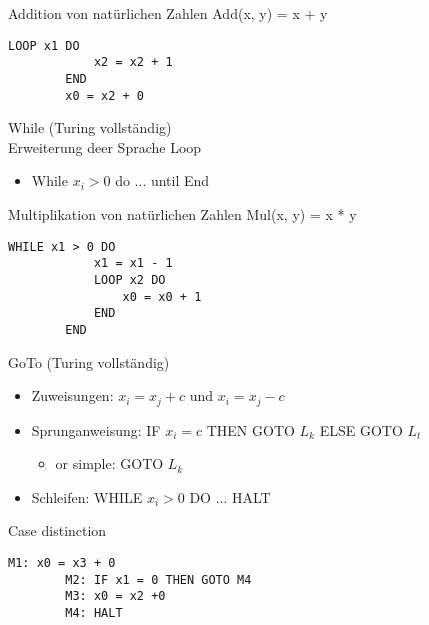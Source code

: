 \begin{example2}{Addition von natürlichen Zahlen}
    Add(x, y) = x + y
    \begin{lstlisting}[style=Pseudocode]
        LOOP x1 DO
            x2 = x2 + 1
        END
        x0 = x2 + 0
    \end{lstlisting}
\end{example2}

\begin{KR}{While (Turing vollständig)}\\
    Erweiterung deer Sprache Loop
    \begin{itemize}
        \item While $x_i > 0$ do ... until End
    \end{itemize}
\end{KR}

\begin{example2}{Multiplikation von natürlichen Zahlen}
    Mul(x, y) = x * y
    \begin{lstlisting}[style=Pseudocode]
        WHILE x1 > 0 DO
            x1 = x1 - 1
            LOOP x2 DO
                x0 = x0 + 1
            END
        END
    \end{lstlisting}
\end{example2}

\begin{KR}{GoTo (Turing vollständig)}
    \begin{itemize}
        \item Zuweisungen: $x_i = x_j + c$ und $x_i = x_j - c$
        \item Sprunganweisung: IF $x_i = c$ THEN GOTO $L_k$ ELSE GOTO $L_t$
        \begin{itemize}
            \item or simple: GOTO $L_k$
        \end{itemize}
        \item Schleifen: WHILE $x_i > 0$ DO ... HALT
    \end{itemize}
\end{KR}

\begin{example2}{Case distinction}
    \begin{lstlisting}[style=Pseudocode]
        M1: x0 = x3 + 0
        M2: IF x1 = 0 THEN GOTO M4
        M3: x0 = x2 +0
        M4: HALT
    \end{lstlisting}
\end{example2}